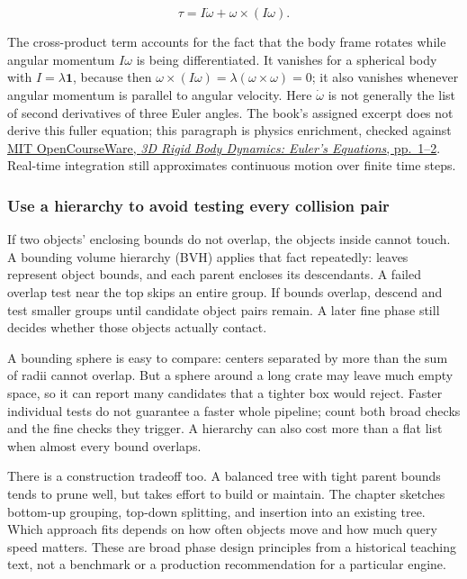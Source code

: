 \[
\tau=I\dot{\omega}+\omega\times(I\omega).
\]

The cross-product term accounts for the fact that the body frame rotates while angular momentum \(I\omega\) is being differentiated. It vanishes for a spherical body with \(I=\lambda\mathbf{1}\), because then \(\omega\times(I\omega)=\lambda(\omega\times\omega)=0\); it also vanishes whenever angular momentum is parallel to angular velocity. Here \(\dot{\omega}\) is not generally the list of second derivatives of three Euler angles. The book's assigned excerpt does not derive this fuller equation; this paragraph is physics enrichment, checked against \href{https://ocw.mit.edu/courses/16-07-dynamics-fall-2009/5e1d8699338146e5127080b880b906d6_MIT16_07F09_Lec28.pdf}{MIT OpenCourseWare, \emph{3D Rigid Body Dynamics: Euler's Equations}, pp.~1--2}. Real-time integration still approximates continuous motion over finite time steps.

\subsubsection{Use a hierarchy to avoid testing every collision pair}\label{use-a-hierarchy-to-avoid-testing-every-collision-pair}

If two objects' enclosing bounds do not overlap, the objects inside cannot touch. A bounding volume hierarchy (BVH) applies that fact repeatedly: leaves represent object bounds, and each parent encloses its descendants. A failed overlap test near the top skips an entire group. If bounds overlap, descend and test smaller groups until candidate object pairs remain. A later fine phase still decides whether those objects actually contact.

A bounding sphere is easy to compare: centers separated by more than the sum of radii cannot overlap. But a sphere around a long crate may leave much empty space, so it can report many candidates that a tighter box would reject. Faster individual tests do not guarantee a faster whole pipeline; count both broad checks and the fine checks they trigger. A hierarchy can also cost more than a flat list when almost every bound overlaps.

There is a construction tradeoff too. A balanced tree with tight parent bounds tends to prune well, but takes effort to build or maintain. The chapter sketches bottom-up grouping, top-down splitting, and insertion into an existing tree. Which approach fits depends on how often objects move and how much query speed matters. These are broad phase design principles from a historical teaching text, not a benchmark or a production recommendation for a particular engine.

